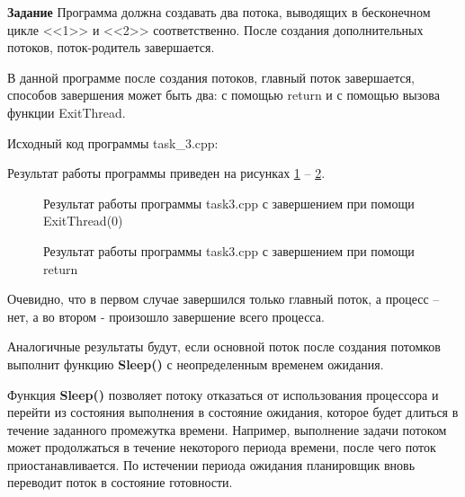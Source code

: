 \documentclass[a4paper]{article}
\begin{document}
	\textbf{Задание} Программа должна создавать два потока, выводящих в бесконечном цикле <<1>> и <<2>> соответственно. После создания дополнительных потоков, поток-родитель завершается.
	
	В данной программе после создания потоков, главный поток завершается, способов завершения может быть два: с помощью return и с помощью вызова функции ExitThread.
	
	Исходный код программы task\_3.cpp:
	
	
	Результат работы программы приведен на рисунках \ref{img:task3_1} -- \ref{img:task3_2}.
	\begin{figure}[h!]
		\caption{Результат работы программы task3.cpp с завершением при помощи ExitThread(0)}
		\label{img:task3_1}
	\end{figure}
	
	\begin{figure}[h!]
		\caption{Результат работы программы task3.cpp с завершением при помощи return}
		\label{img:task3_2}
	\end{figure}
	
	Очевидно, что в первом случае завершился только главный поток, а процесс – нет, а во втором - произошло завершение всего процесса.
	
	Аналогичные результаты будут, если основной поток после создания потомков выполнит функцию \textbf{Sleep()} с неопределенным временем ожидания.
	
	Функция \textbf{Sleep()} позволяет потоку отказаться от использования процессора и перейти из состояния выполнения в состояние ожидания, которое будет длиться в течение заданного промежутка времени. Например, выполнение задачи потоком может продолжаться в течение некоторого периода времени, после чего поток приостанавливается. По истечении периода ожидания планировщик вновь переводит поток в состояние готовности.
	
\end{document}
